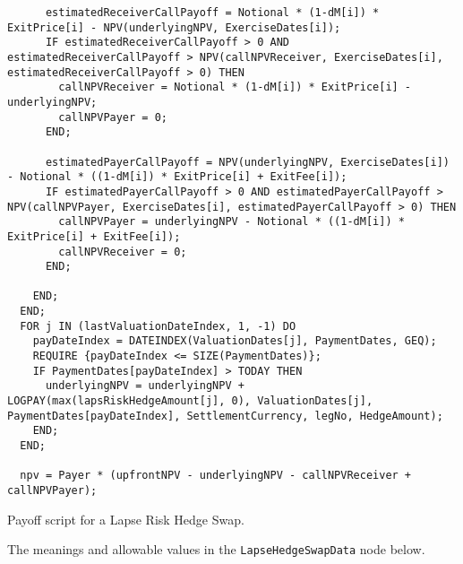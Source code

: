 \begin{listing}[hbt]
\begin{verbatim}
      estimatedReceiverCallPayoff = Notional * (1-dM[i]) * ExitPrice[i] - NPV(underlyingNPV, ExerciseDates[i]);
      IF estimatedReceiverCallPayoff > 0 AND estimatedReceiverCallPayoff > NPV(callNPVReceiver, ExerciseDates[i], estimatedReceiverCallPayoff > 0) THEN
        callNPVReceiver = Notional * (1-dM[i]) * ExitPrice[i] - underlyingNPV;
        callNPVPayer = 0;
      END; 

      estimatedPayerCallPayoff = NPV(underlyingNPV, ExerciseDates[i]) - Notional * ((1-dM[i]) * ExitPrice[i] + ExitFee[i]);
      IF estimatedPayerCallPayoff > 0 AND estimatedPayerCallPayoff > NPV(callNPVPayer, ExerciseDates[i], estimatedPayerCallPayoff > 0) THEN
        callNPVPayer = underlyingNPV - Notional * ((1-dM[i]) * ExitPrice[i] + ExitFee[i]);
        callNPVReceiver = 0;
      END; 
      
    END;
  END;
  FOR j IN (lastValuationDateIndex, 1, -1) DO
    payDateIndex = DATEINDEX(ValuationDates[j], PaymentDates, GEQ);
    REQUIRE {payDateIndex <= SIZE(PaymentDates)};
    IF PaymentDates[payDateIndex] > TODAY THEN
      underlyingNPV = underlyingNPV + LOGPAY(max(lapsRiskHedgeAmount[j], 0), ValuationDates[j], PaymentDates[payDateIndex], SettlementCurrency, legNo, HedgeAmount);
    END;
  END;

  npv = Payer * (upfrontNPV - underlyingNPV - callNPVReceiver + callNPVPayer);
\end{verbatim} 
\caption{Payoff script for a Lapse Risk Hedge Swap.} 
\label{lst:lapse_risk_hedge_swap} 
\end{listing} 
 
The meanings and allowable values in the \lstinline!LapseHedgeSwapData! node below.
 
